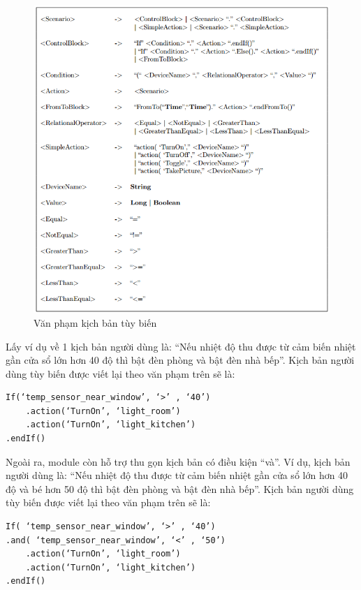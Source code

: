 \documentclass[12pt,a4paper,oneside]{extbook}
\begin{document}
\begin{figure}[h!]
  \centering
     \includegraphics[width=16cm]{6-user-grammar}
  \caption{Văn phạm kịch bản tùy biến}\label{fig:6-user-grammar}
\end{figure}

\noindent
Lấy ví dụ về 1 kịch bản người dùng là: “Nếu nhiệt độ thu được từ cảm biến nhiệt gần cửa sổ lớn hơn 40 độ thì bật đèn phòng và bật đèn nhà bếp”. Kịch bản người dùng tùy biến được viết lại theo văn phạm trên sẽ là:
\begin{verbatim}
If(‘temp_sensor_near_window’, ‘>’ , ‘40’)
	.action(‘TurnOn’, ‘light_room’)
	.action(‘TurnOn’, ‘light_kitchen’)
.endIf()
\end{verbatim}

\noindent
Ngoài ra, module còn hỗ trợ thu gọn kịch bản có điều kiện “và”. Ví dụ, kịch bản người dùng là: “Nếu nhiệt độ thu được từ cảm biến nhiệt gần cửa sổ lớn hơn 40 độ và bé hơn 50 độ thì bật đèn phòng và bật đèn nhà bếp”. Kịch bản người dùng tùy biến được viết lại theo văn phạm trên sẽ là:
\begin{verbatim}
If( ‘temp_sensor_near_window’, ‘>’ , ‘40’)
.and( ‘temp_sensor_near_window’, ‘<’ , ‘50’)
	.action(‘TurnOn’, ‘light_room’)
	.action(‘TurnOn’, ‘light_kitchen’)
.endIf()
\end{verbatim}
\end{document}

